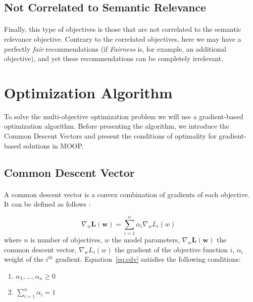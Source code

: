 \documentclass[letterpaper]{article}
\begin{document}
\subsection{Not Correlated to Semantic Relevance}
\paragraph{}

Finally, this type of objectives is those that are not correlated to the semantic relevance objective. Contrary to the correlated objectives, here we may have a perfectly \textit{fair} recommendations (if \textit{Fairness} is, for example, an additional objective), and yet these recommendations can be completely irrelevant.



\section{Optimization Algorithm}
To solve the multi-objective optimization problem we will use a gradient-based optimization algorithm. Before presenting the algorithm, we introduce the Common Descent Vectors and present the conditions of optimality for gradient-based solutions in MOOP.

\subsection{Common Descent Vector}
\paragraph{}

A common descent vector is a convex combination of gradients of each objective. It can be defined as follows \cite{desideri:hal-00768935}:

\begin{equation}
    \label{eq:cdv}
    \nabla_{w} \mathbf{L(w)}=\sum_{i=1}^{n} \alpha_{i} \nabla_{w} L_{i}(w)
\end{equation}
where $n$ is number of objectives, $w$ the model parameters, $\nabla_{w} \mathbf{L(w)}$ the common descent vector, $\nabla_{w} L_{i}(w)$ the gradient of the objective function $i$, $\alpha_{i}$ weight of the $i^{th}$ gradient. Equation~\ref{eq:cdv} satisfies the following conditions:

\begin{enumerate}
    \item $\alpha_{1}, \ldots, \alpha_{n} \geq 0$
    \item $\sum_{i=1}^{n} \alpha_{i}=1$
\end{enumerate}
\end{document}
